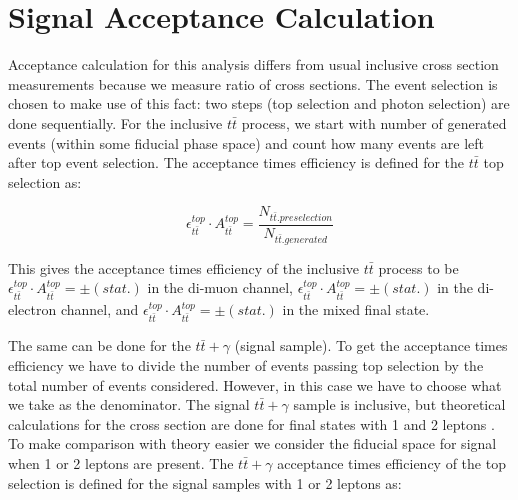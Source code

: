 

\section{Signal Acceptance Calculation} \label{subsec-SignalAcceptanceCalculation}

Acceptance calculation for this analysis differs from usual inclusive cross section measurements because we measure ratio of cross sections. The event selection is chosen to make use of this fact: two steps (top selection and photon selection) are done sequentially. For the inclusive $t\bar{t}$ process, we start with number of generated events (within some fiducial phase space) and count how many events are left after top event selection. The acceptance times efficiency is defined for the $t\bar{t}$ top selection as:

\begin{equation}
	\epsilon_{t\bar{t}}^{top} \cdot A_{t\bar{t}}^{top} = \frac{N_{t\bar{t}.preselection}}{N_{t\bar{t}.generated}} 
\end{equation}

This gives the acceptance times efficiency of the inclusive $t\bar{t}$ process to be $\epsilon_{t\bar{t}}^{top} \cdot A_{t\bar{t}}^{top} =   \pm  (stat.)$ in the di-muon channel, $\epsilon_{t\bar{t}}^{top} \cdot A_{t\bar{t}}^{top} =  \pm  (stat.)$ in the di-electron channel, and $\epsilon_{t\bar{t}}^{top} \cdot A_{t\bar{t}}^{top} =  \pm  (stat.)$ in the mixed final state.

The same can be done for the $t\bar{t}+\gamma$ (signal sample). To get the acceptance times efficiency we have to divide the number of events passing top selection by the total number of events considered. However, in this case we have to choose what we take as the denominator. The signal $t\bar{t}+\gamma$ sample is inclusive, but theoretical calculations for the cross section are done for final states with 1 and 2 leptons \cite{QCDCorrectionsttgamma2011}. To make comparison with theory easier we consider the fiducial space for signal when 1 or 2 leptons are present. The $t\bar{t}+\gamma$ acceptance times efficiency of the top selection is defined for the signal samples with 1 or 2 leptons as:

